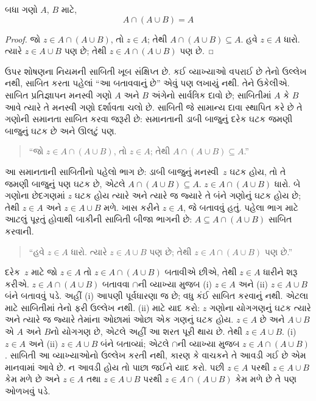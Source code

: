 \begin{prop}[શોષણ]
બધા ગણો $A$, $B$ માટે,
\[
A \cap (A \cup B) = A
\]
\end{prop}

\begin{proof}
જો $z \in A \cap (A \cup B)$, તો $z \in A$; તેથી $A \cap (A \cup B)
\subseteq A$. હવે $z \in A$ ધારો. ત્યારે $z \in A \cup B$ પણ છે;
તેથી $z \in A \cap (A \cup B)$ પણ છે.
\end{proof}

ઉપર શોષણના નિયમની સાબિતી ખૂબ સંક્ષિપ્ત છે. કઈ વ્યાખ્યાઓ
વપરાઈ છે તેનો ઉલ્લેખ નથી, સાબિત કરતા પહેલાં ``આ બતાવવાનું
છે'' એવું પણ લખાયું નથી. તેને ઉકેલીએ. સાબિત પ્રતિજ્ઞાપન
મનસ્વી ગણો $A$ અને $B$ અંગેનો સાર્વત્રિક દાવો છે; સાબિતીમાં
$A$ કે $B$ આવે ત્યારે તે મનસ્વી ગણો દર્શાવતા ચલો છે.
સાબિતી જે સામાન્ય દાવા સ્થાપિત કરે છે તે ગણોની સમાનતા
સાબિત કરવા જરૂરી છે: સમાનતાની ડાબી બાજુનું દરેક ઘટક
જમણી બાજુનું ઘટક છે અને ઊલટું પણ.

\begin{quote}
``જો $z \in A \cap (A \cup B)$, તો $z \in A$; તેથી $A \cap (A \cup B)
  \subseteq A$.''
\end{quote}

આ સમાનતાની સાબિતીનો પહેલો ભાગ છે: ડાબી બાજુનું મનસ્વી~$z$
ઘટક હોય, તો તે જમણી બાજુનું પણ ઘટક છે,
એટલે $A \cap (A \cup B) \subseteq A$. $z \in A \cap (A \cup B)$
ધારો. બે ગણોના છેદગણમાં $z$ ઘટક હોય ત્યારે અને ત્યારે જ
જ્યારે તે બંને ગણોનું ઘટક હોય છે; તેથી $z \in A$
અને $z \in A \cup B$ મળે. ખાસ કરીને $z \in A$, જે બતાવવું
હતું. પહેલા ભાગ માટે આટલું પૂરતું હોવાથી બાકીની સાબિતી
બીજા ભાગની છે: $A \subseteq A \cap
(A \cup B)$ સાબિત કરવાની.

\begin{quote}
``હવે $z \in A$ ધારો. ત્યારે $z \in A \cup B$ પણ છે;
તેથી $z \in A \cap (A \cup B)$ પણ છે.''
\end{quote}

દરેક~$z$ માટે જો $z \in A$ તો $z \in A \cap (A \cup B)$
બતાવીએ છીએ, તેથી $z \in A$ ધારીને શરૂ કરીએ. $z
\in A \cap (A \cup B)$ બતાવવા $\cap$ની વ્યાખ્યા મુજબ
(i) $z \in A$ અને (ii) $z \in A \cup B$ બંને બતાવવું પડે.
અહીં (i) આપણી પૂર્વધારણા જ છે; વધુ કંઈ સાબિત કરવાનું નથી.
એટલા માટે સાબિતીમાં તેનો ફરી ઉલ્લેખ નથી. (ii) માટે યાદ કરો:
$z$ ગણોના યોગગણનું ઘટક ત્યારે અને ત્યારે જ જ્યારે
તેમાંના ઓછામાં ઓછા એક ગણનું ઘટક હોય. $z \in A$
છે અને $A \cup B$ એ $A$ અને $B$નો યોગગણ છે, એટલે અહીં
આ શરત પૂરી થાય છે. તેથી $z \in A \cup B$. (i) $z \in A$
અને (ii) $z \in A \cup B$ બંને બતાવ્યાં; એટલે $\cap$ની
વ્યાખ્યા મુજબ $z \in A \cap (A \cup B)$. સાબિતી આ
વ્યાખ્યાઓનો ઉલ્લેખ કરતી નથી, કારણ કે વાચકને તે આવડી ગઈ છે
એમ માનવામાં આવે છે. ન આવડી હોય તો પાછા જઈને યાદ કરો.
પછી $z
\in A$ પરથી $z \in A \cup B$ કેમ મળે છે અને $z \in A$
તથા $z \in A \cup B$ પરથી $z \in A \cap (A \cup B)$
કેમ મળે છે તે પણ ઓળખવું પડે.

